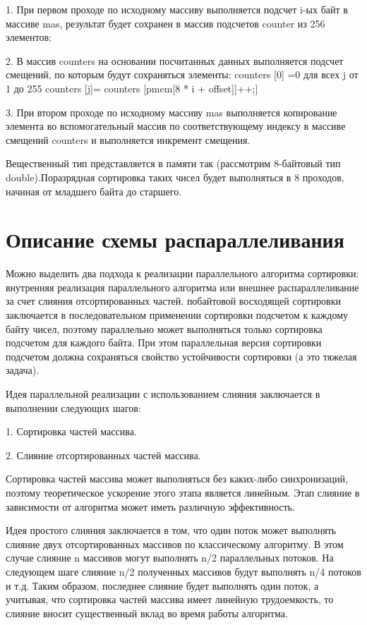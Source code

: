 \documentclass{report}
\begin{document}
1.	При первом проходе по исходному массиву выполняется подсчет
i-ых байт в массиве mas, результат будет сохранен в массив подсчетов
counter из 256 элементов;

2.	В массив counters на основании посчитанных данных выполняется
подсчет смещений, по которым будут сохраняться элементы:
counters [0] =0 для всех j от 1 до 255 counters [j]= counters [pmem[8 * i + offset]]++;]

3.	При втором проходе по исходному массиву mas выполняется
копирование элемента во вспомогательный массив по соответствующему индексу в массиве смещений counters и выполняется
инкремент смещения.

Вещественный тип представляется в памяти так (рассмотрим 8-байтовый тип double).Поразрядная сортировка таких чисел будет выполняться в 8 проходов, начиная от младшего байта до старшего.


\newpage

\section*{Описание схемы распараллеливания}

\par Можно выделить два подхода к реализации параллельного алгоритма сортировки: внутренняя реализация параллельного алгоритма или внешнее распараллеливание за счет слияния отсортированных частей.
 побайтовой восходящей сортировки заключается в последовательном применении сортировки подсчетом к каждому байту чисел, поэтому параллельно может выполняться только сортировка подсчетом для каждого байта. При этом параллельная версия сортировки подсчетом должна сохраняться свойство устойчивости сортировки (а это тяжелая задача).
\par Идея параллельной реализации с использованием слияния заключается в выполнении следующих шагов:

1. Сортировка частей массива.
\par2. Слияние отсортированных частей массива.

\par Сортировка частей массива может выполняться без каких-либо синхронизаций, поэтому теоретическое ускорение этого этапа является линейным. Этап слияние в зависимости от алгоритма может иметь различную эффективность.

\par Идея простого слияния заключается в том, что один поток может выполнять слияние двух отсортированных массивов по классическому алгоритму. В этом случае слияние n массивов могут выполнять n/2 параллельных потоков. На следующем шаге слияние n/2 полученных массивов будут выполнять n/4 потоков и т.д. Таким образом, последнее слияние будет выполнять один поток, а учитывая, что сортировка частей массива имеет линейную трудоемкость, то слияние вносит существенный вклад во время работы алгоритма.
\end{document}
